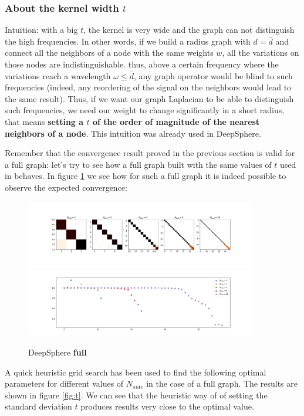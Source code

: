 \subsubsection{About the kernel width $t$}
Intuition: with a big $t$, the kernel is very wide and the graph can not distinguish the high frequencies. In other words, if we build a radius graph with $d=\bar d$ and connect all the neighbors of a node with the same weights $w$, all the variations on those nodes are indistinguishable. thus, above a certain frequency where the variations reach a wavelength $\omega \leq \bar d$, any graph operator would be blind to such frequencies (indeed, any reordering of the signal on the neighbors would lead to the same result). Thus, if we want our graph Laplacian to be able to distinguish such frequencies, we need our weight to change significantly in a short radius, that means \textbf{setting a $t$ of the order of magnitude of the nearest neighbors of a node}. This intuition was already used in DeepSphere. 

Remember that the convergence result proved in the previous section is valid for a full graph: let's try to see how a full graph built with the same values of $t$ used in \cite{DeepSphere} behaves. 
In figure \ref{fig:DeepSphere_full} we see how for such a full graph it is indeed possible to observe the expected convergence:
\begin{figure}[h]
	\label{fig:DeepSphere_full}
	\caption{DeepSphere \textbf{full}}
	\centering
	\includegraphics[width=0.9\textwidth]{../codes/02.HeatKernelGraphLaplacian/HEALPix/06_figures/deepsphere_full.png}
	\includegraphics[width=0.9\textwidth]{../codes/02.HeatKernelGraphLaplacian/HEALPix/06_figures/deepsphere_full_diagonal.png}	
\end{figure}
A quick heuristic grid search has been used to find the following optimal parameters for different values of $N_{side}$ in the case of a full graph. The results are shown in figure \ref{fig:t}. We can see that the heuristic way of \cite{DeepSphere} of setting the standard deviation $t$ produces results very close to the optimal value.

